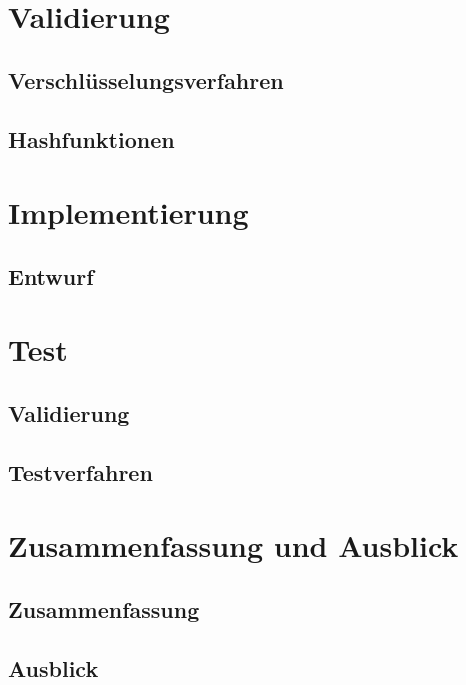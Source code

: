 \documentclass[10pt, a4paper]{scrreprt}
\begin{document}
\chapter{Validierung}
\section{Verschlüsselungsverfahren}
\section{Hashfunktionen}

\chapter{Implementierung}
\section{Entwurf}

\chapter{Test}
\section{Validierung}
\section{Testverfahren}

\chapter{Zusammenfassung und Ausblick}
\section{Zusammenfassung}
\section{Ausblick}

\end{document}
